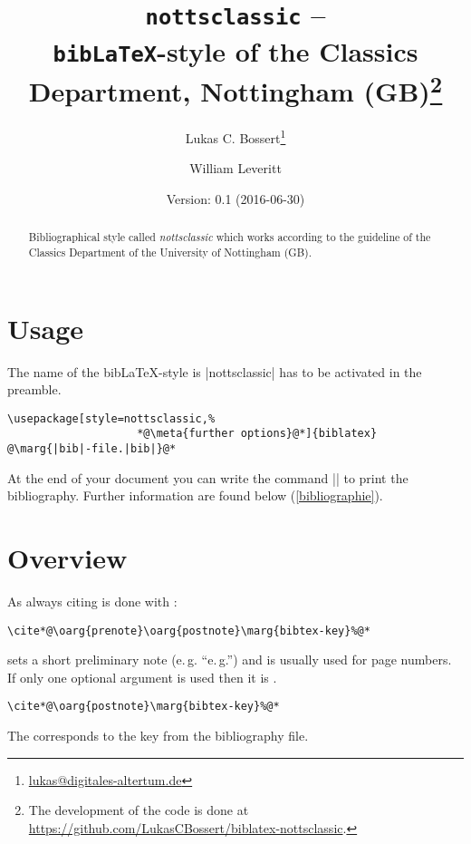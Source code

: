 \documentclass[a4paper,
10pt,
english
]{ltxdoc}
\begin{document}
\title{\texttt{nottsclassic} -- \\\texttt{bib\LaTeX}-style of the Classics Department, Nottingham (GB)\footnote{The development of the code is done at \url{https://github.com/LukasCBossert/biblatex-nottsclassic}.}}
\author{Lukas C. Bossert\thanks{\href{mailto:lukas@digitales-altertum.de}{lukas@digitales-altertum.de}} \and William Leveritt}
\date{Version: 0.1 (2016-06-30)}
 \maketitle
\begin{abstract}
Bibliographical style called \emph{nottsclassic} which works according to the guideline of the Classics Department of the University of Nottingham (GB).
 \end{abstract}




\section{Usage}
   The name of the bib\LaTeX-style is  |nottsclassic| has to be activated in the preamble. 

\begin{lstlisting}
\usepackage[style=nottsclassic,%
					*@\meta{further options}@*]{biblatex}
@\marg{|bib|-file.|bib|}@*
\end{lstlisting}


At the end of your document you can write the command |\printbibliography| to print 
the bibliography. 
Further information are found below   (\cref{bibliographie}).

\section{Overview}\label{overview}

\DescribeMacro{\cite}%
As always citing is done with :
\begin{lstlisting}
\cite*@\oarg{prenote}\oarg{postnote}\marg{bibtex-key}%@*
\end{lstlisting}

 sets a short preliminary note (e.\,g. \enquote{e.\,g.}) and  is usually used for page numbers.
If only one optional argument is used then it is .
\begin{lstlisting}
\cite*@\oarg{postnote}\marg{bibtex-key}%@*
\end{lstlisting}
The  corresponds to the key from the bibliography file.
\end{document}
